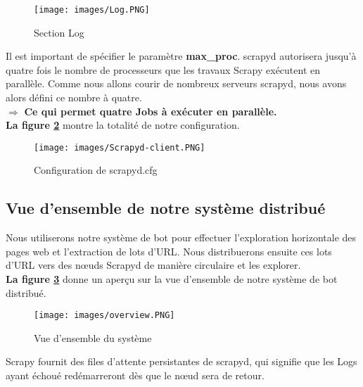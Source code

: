 \begin{figure}[H]
            \centering
            \texttt{[image: images/Log.PNG]}
            \caption{Section Log}
            \label{fig:Section Log}  
        \end{figure}
Il est important de spécifier le paramètre \textbf{max\_proc}. scrapyd autorisera jusqu'à quatre fois le nombre de processeurs que les travaux Scrapy exécutent en parallèle. Comme nous allons courir de nombreux serveurs scrapyd, nous avons alors défini ce nombre à quatre.\\
$\Rightarrow$ \textbf{Ce qui permet quatre Jobs à exécuter en parallèle.}\\
\textbf{La figure \ref{fig:scrapyd.cfg}} montre la totalité de notre configuration.
\begin{figure}[H]
            \centering
            \texttt{[image: images/Scrapyd-client.PNG]}
            \caption{Configuration de scrapyd.cfg}
            \label{fig:scrapyd.cfg}  
        \end{figure}
\newpage
\subsection{Vue d'ensemble de notre système distribué}
Nous utiliserons notre système de bot pour effectuer l'exploration horizontale des pages web et l'extraction de lots d'URL. Nous distribuerons ensuite
ces lots d'URL vers des nœuds Scrapyd de manière circulaire et les explorer.\\
\textbf{La figure \ref{fig:vue}} donne un aperçu sur la vue d'ensemble de notre système de bot distribué.
\begin{figure}[H]
            \centering
            \texttt{[image: images/overview.PNG]}
            \caption{Vue d'ensemble du système \cite{book}}
            \label{fig:vue}  
        \end{figure}
Scrapy fournit des files d'attente persistantes de scrapyd, qui signifie que les Logs ayant échoué redémarreront dès que le nœud sera de retour.
